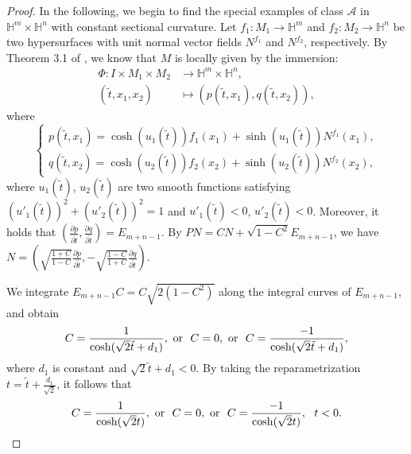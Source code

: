 \documentclass[reqno]{amsart}%
\theoremstyle{definition}
\numberwithin{equation}{section}
\begin{document}
\begin{proof}
In the following, we begin to find the special examples of class $\mathcal{A}$ in $\mathbb{H}^m\times\mathbb{H}^n$ with 
constant sectional curvature. 
Let $f_1:M_1\rightarrow \mathbb{H}^m$ and $f_2:M_2\rightarrow \mathbb{H}^n$ 
be two hypersurfaces with unit normal vector fields $N^{f_1}$ and $N^{f_2}$, respectively. 
By Theorem 3.1 of \cite{CT}, we know that $M$ is locally given by the immersion: 
%
\begin{equation}\label{eqn:APXap3.1}
	\begin{aligned}
		\Phi:I\times M_1\times M_2&\longrightarrow \mathbb{H}^m\times \mathbb{H}^n,\\
		(\tilde{t},x_1,x_2)&\longmapsto (p(\tilde{t},x_1),q(\tilde{t},x_2)),
	\end{aligned}
\end{equation}
%
where
%
$$
\left\{\begin{aligned}
	p(\tilde{t},x_1)=\cosh(u_1(\tilde{t}))f_1(x_1)+\sinh(u_1(\tilde{t}))N^{f_1}(x_1),\\
	q(\tilde{t},x_2)=\cosh(u_2(\tilde{t}))f_2(x_2)+\sinh(u_2(\tilde{t}))N^{f_2}(x_2),  
\end{aligned}\right.
$$
%
where $u_1(\tilde{t})$, $u_2(\tilde{t})$ are two smooth functions satisfying
$(u'_{1}(\tilde{t}))^2+(u'_{2}(\tilde{t}))^2=1$ and $u'_{1}(\tilde{t})<0$, $u'_{2}(\tilde{t})<0$.
Moreover, it holds that $(\frac{\partial p}{\partial \tilde{t}},\frac{\partial q}{\partial \tilde{t}})=E_{m+n-1}$. By 
$PN=CN+\sqrt{1-C^2}E_{m+n-1}$, we have $N=(\sqrt{\frac{1+C}{1-C}}\frac{\partial p}{\partial \tilde{t}},-\sqrt{\frac{1-C}{1+C}}\frac{\partial q}{\partial \tilde{t}})$.

We integrate $E_{m+n-1}C=C\sqrt{2(1-C^2)}$ along the integral curves of $E_{m+n-1}$, and obtain
$$
C=\frac{1}{\cosh(\sqrt{2}\tilde{t}+d_1)},\ {\rm or}\ \  C=0,
\ {\rm or}\ \  C=\frac{-1}{\cosh(\sqrt{2}\tilde{t}+d_1)}, 
$$
where $d_1$ is constant and $\sqrt{2}\tilde{t}+d_1<0$. By taking the reparametrization $t=\tilde{t}+\frac{d_1}{\sqrt{2}}$, it follows that 
$$
C=\frac{1}{\cosh(\sqrt{2}t)},\ {\rm or}\ \  C=0,
\ {\rm or}\ \  C=\frac{-1}{\cosh(\sqrt{2}t)},\ \ t<0.  
$$



\end{proof}
\end{document}
